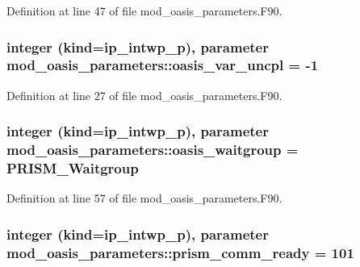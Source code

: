 Definition at line 47 of file mod\+\_\+oasis\+\_\+parameters.\+F90.

\hypertarget{classmod__oasis__parameters_ac906e1466e6cdc300a0b582af6619ca5}{
\subsubsection[{oasis\+\_\+var\+\_\+uncpl}]{\setlength{\rightskip}{0pt plus 5cm}integer (kind=ip\+\_\+intwp\+\_\+p), parameter mod\+\_\+oasis\+\_\+parameters\+::oasis\+\_\+var\+\_\+uncpl = -\/1}}\label{classmod__oasis__parameters_ac906e1466e6cdc300a0b582af6619ca5}


Definition at line 27 of file mod\+\_\+oasis\+\_\+parameters.\+F90.

\hypertarget{classmod__oasis__parameters_a2cc23572d33c536d49a53587359b68f0}{
\subsubsection[{oasis\+\_\+waitgroup}]{\setlength{\rightskip}{0pt plus 5cm}integer (kind=ip\+\_\+intwp\+\_\+p), parameter mod\+\_\+oasis\+\_\+parameters\+::oasis\+\_\+waitgroup = P\+R\+I\+S\+M\+\_\+\+Waitgroup}}\label{classmod__oasis__parameters_a2cc23572d33c536d49a53587359b68f0}


Definition at line 57 of file mod\+\_\+oasis\+\_\+parameters.\+F90.

\hypertarget{classmod__oasis__parameters_a953f0a4738f9ca919cf5e446998cc79e}{
\subsubsection[{prism\+\_\+comm\+\_\+ready}]{\setlength{\rightskip}{0pt plus 5cm}integer (kind=ip\+\_\+intwp\+\_\+p), parameter mod\+\_\+oasis\+\_\+parameters\+::prism\+\_\+comm\+\_\+ready = 101}}\label{classmod__oasis__parameters_a953f0a4738f9ca919cf5e446998cc79e}


